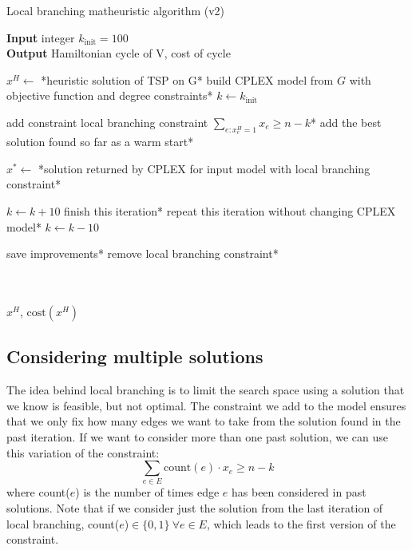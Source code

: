 \begin{algorithm}[h]
    \caption{Local branching matheuristic algorithm (v2)}
    \textbf{Input} integer $k_{\text{init}} = 100$\\
    \textbf{Output} Hamiltonian cycle of V, cost of cycle\\
    \begin{algorithmic}

        \State $x^H \gets$ *heuristic solution of TSP on G*
        \State *build CPLEX model from $G$ with objective function and degree constraints*
        \State $k\gets k_{\text{init}}$


                \State *add constraint local branching constraint $\sum_{e:x_e^H=1}x_e\geq n-k$*
                \State *add the best solution found so far as a warm start*
            \EndIf

            \State $x^*\gets$ *solution returned by CPLEX for input model with local branching constraint*


                    \State $k\gets k+10$
                    \State *finish this iteration*
                \Else
                    \State *repeat this iteration without changing CPLEX model*
                \EndIf
            \Else
                    \State $k\gets k-10$
                \EndIf
            \EndIf

            \State *save improvements*
            \State *remove local branching constraint*

        \EndWhile\\\\

        \Return $x^H$, $\text{cost}(x^H)$

    \end{algorithmic}
\end{algorithm}

\newpage

\subsection{Considering multiple solutions}

The idea behind local branching is to limit the search space using a solution that we know is feasible, but not optimal. The constraint we add to the model ensures that we only fix how many edges we want to take from the solution found in the past iteration. If we want to consider more than one past solution, we can use this variation of the constraint:
$$\sum_{e\in E}\mbox{count}(e)\cdot x_e\geq n-k$$
where count($e$) is the number of times edge $e$ has been considered in past solutions. Note that if we consider just the solution from the last iteration of local branching, count($e$)$\in\{0,1\} \ \forall e\in E$, which leads to the first version of the constraint.

